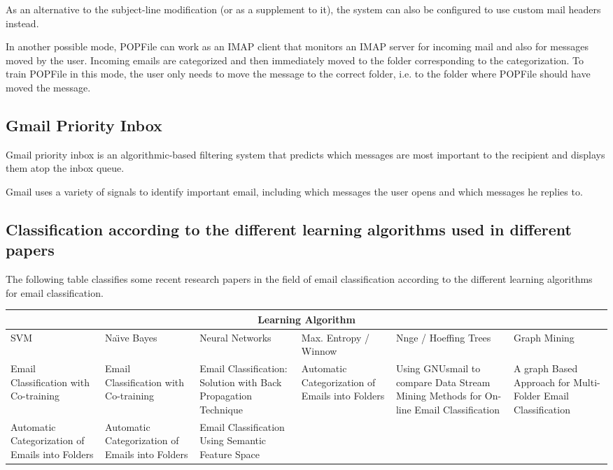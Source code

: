 As an alternative to the subject-line modification (or as a supplement to it), the system can also be configured to use custom mail headers instead.

In another possible mode, POPFile can work as an IMAP client that monitors an IMAP server for incoming mail and also for messages moved by the user. Incoming emails are categorized and then immediately moved to the folder corresponding to the categorization. To train POPFile in this mode, the user only needs to move the message to the correct folder, i.e. to the folder where POPFile should have moved the message.

\subsection{Gmail Priority Inbox}
Gmail priority inbox is an algorithmic-based filtering system that predicts which messages are most important to the recipient and displays them atop the inbox queue.

Gmail uses a variety of signals to identify important email, including which messages the user opens and which messages he replies to.

\subsection{Classification according to the different learning algorithms used in different 
papers}
The following table classifies some recent research papers in the field of email classification according to the different learning algorithms for email classification.
\begin{center}
\begin{tabular}{|p{2cm}|p{2cm}|p{2cm}|p{2cm}|p{2cm}|p{2cm}|}
\hline
\multicolumn{6}{|c|}{Learning Algorithm} \\
\hline
SVM & Na\"{\i}ve Bayes & Neural Networks & Max. Entropy / Winnow & Nnge / Hoeffing Trees & Graph Mining \\ \hline
Email Classification with Co-training \cite{SVETLANA01} &
Email Classification with Co-training \cite{SVETLANA01} &
Email Classification: Solution with Back Propagation Technique \cite{mous05} & 
Automatic Categorization of Emails into Folders \cite{RON04} &
Using GNUsmail to compare Data Stream Mining Methods for On-line Email Classification \cite{JOSE11} &
A graph Based Approach for Multi-Folder Email Classification \cite{sift02} \\ \hline

Automatic Categorization of Emails into Folders \cite{RON04} &
Automatic Categorization of Emails into Folders \cite{RON04} &
Email Classification Using Semantic Feature Space \cite{YUN08} & 
&
& \\ \hline
\end{tabular}
\end{center}
\newpage


